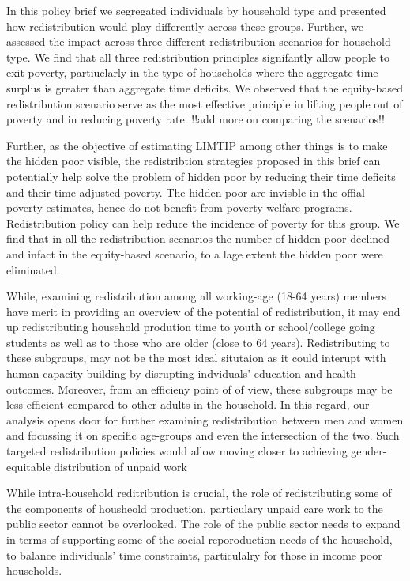 \documentclass[
  11pt,
]{article}
\begin{document}
In this policy brief we segregated individuals by household type and
presented how redistribution would play differently across these groups.
Further, we assessed the impact across three different redistribution
scenarios for household type. We find that all three redistribution
principles signifantly allow people to exit poverty, partiuclarly in the
type of households where the aggregate time surplus is greater than
aggregate time deficits. We observed that the equity-based
redistribution scenario serve as the most effective principle in lifting
people out of poverty and in reducing poverty rate. !!add more on
comparing the scenarios!!

Further, as the objective of estimating LIMTIP among other things is to
make the hidden poor visible, the redistribtion strategies proposed in
this brief can potentially help solve the problem of hidden poor by
reducing their time deficits and their time-adjusted poverty. The hidden
poor are invisble in the offial poverty estimates, hence do not benefit
from poverty welfare programs. Redistribution policy can help reduce the
incidence of poverty for this group. We find that in all the
redistribution scenarios the number of hidden poor declined and infact
in the equity-based scenario, to a lage extent the hidden poor were
eliminated.

While, examining redistribution among all working-age (18-64 years)
members have merit in providing an overview of the potential of
redistribution, it may end up redistributing household prodution time to
youth or school/college going students as well as to those who are older
(close to 64 years). Redistributing to these subgroups, may not be the
most ideal situtaion as it could interupt with human capacity building
by disrupting indviduals' education and health outcomes. Moreover, from
an efficieny point of of view, these subgroups may be less efficient
compared to other adults in the household. In this regard, our analysis
opens door for further examining redistribution between men and women
and focussing it on specific age-groups and even the intersection of the
two. Such targeted redistribution policies would allow moving closer to
achieving gender-equitable distribution of unpaid work

While intra-household reditribution is crucial, the role of
redistributing some of the components of housheold production,
particulary unpaid care work to the public sector cannot be overlooked.
The role of the public sector needs to expand in terms of supporting
some of the social reporoduction needs of the household, to balance
individuals' time constraints, particulalry for those in income poor
households.
\end{document}
